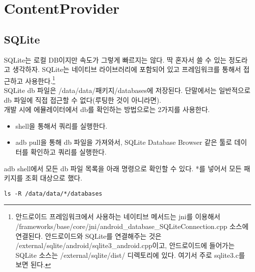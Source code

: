 \chapter{ContentProvider}
\section{SQLite}\label{sec:sqlite}
SQLite는 로컬 DB이지만 속도가 그렇게 빠르지는 않다. 딱 혼자서 쓸 수 있는 정도라고 생각하자.
SQLite는 네이티브 라이브러리에 포함되어 있고 프레임워크를 통해서 접근하고 사용한다.\footnote{안드로이드 프레임워크에서 사용하는 네이티브 메서드는 jni를 이용해서 /frameworks/base/core/jni/android\_database\_SQLiteConnection.cpp 소스에 연결된다.
안드로이드와 SQLite를 연결해주는 것은 /external/sqlite/android/sqlite3\_android.cpp이고,
안드로이드에 들어가는 SQLite 소스는 /external/sqlite/dist/ 디렉토리에 있다. 여기서 주로 sqlite3.c를 보면 된다.}\\

SQLite db 파일은 /data/data/패키지/databases에 저장된다. 
단말에서는 일반적으로 db 파일에 직접 접근할 수 없다(루팅한 것이 아니라면).\\

개발 시에 에뮬레이터에서 db를 확인하는 방법으로는 2가지를 사용한다.
\begin{itemize}
\item shell을 통해서 쿼리를 실행한다.
\item adb pull을 통해 db 파일을 가져와서, SQLite Database Browser 같은 툴로 데이터를 확인하고 쿼리를 실행한다.
\end{itemize}

adb shell에서 모든 db 파일 목록을 아래 명령으로 확인할 수 있다. *를 넣어서 모든 패키지를 조회 대상으로 했다. 
\begin{lstlisting}[frame=single]
 ls -R /data/data/*/databases 
\end{lstlisting}

